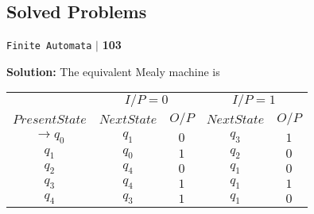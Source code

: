 \documentclass[8pt]{beamer}
\begin{document}
\begin{frame}
 \section*{Solved Problems}
\begin{flushright}
 \texttt{Finite Automata} \hspace*{0.1cm}\textbf{$|$} \hspace*{0.1cm} \textbf{103}\hspace*{0.1cm}
\end{flushright}
\vspace*{0.5cm}

\textbf{Solution:} The equivalent Mealy machine is\\

\begin{center}
\begin{tabular}{ccccc}
 \hline

 \hline

 \hline

 \hline
 &  \multicolumn{2}{c}{$I/P = 0$ } &  \multicolumn{2}{c}{$I/P = 1$}  \\
  \cline{2-3}                         \cline{4-5}
 $Present State$ &   $Next State$  & $O/P$ &  $Next State$  & $O/P$\\
\hline
$\rightarrow q_0$  &  $q_1$  &  $0$  &  $q_3$  & $1$ \\
$q_1$             &  $q_0$  &  $1$  &  $q_2$  & $0$ \\
$q_2$             &  $q_4$  &  $0$  &  $q_1$  & $0$ \\
$q_3$             &  $q_4$  &  $1$  &  $q_1$  & $1$ \\
$q_4$             &  $q_3$  &  $1$  &  $q_1$  & $0$ \\
 \hline

 \hline

 \hline

 \hline
\end{tabular}
\end{center}

\vspace*{0.3cm}
\end{frame}
\end{document}
